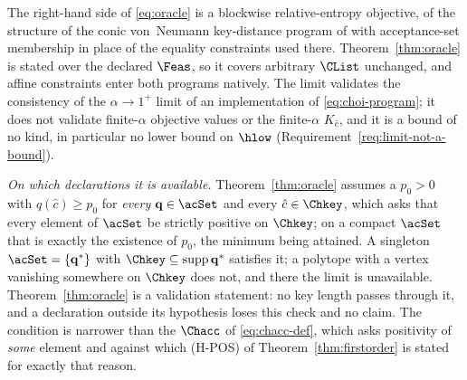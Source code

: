 
\begin{remark}\label{rem:oracle}
The right-hand side of \eqref{eq:oracle} is a blockwise relative-entropy
objective, of the structure of the conic von~Neumann key-distance program
of \cite[Eqs.~(1)--(6)]{winick2018reliable} with acceptance-set membership
in place of the equality constraints used there. Theorem~\ref{thm:oracle}
is stated over the declared $\Feas$, so it covers arbitrary $\CList$
unchanged, and affine constraints enter both programs natively. The limit
validates the consistency of the $\alpha\to1^{+}$ limit of an
implementation of \eqref{eq:choi-program}; it does not validate
finite-$\alpha$ objective values or the finite-$\alpha$ $K_{\hat c}$, and
it is a bound of no kind, in particular no lower bound on $\hlow$
(Requirement~\ref{req:limit-not-a-bound}).

\emph{On which declarations it is available.}
Theorem~\ref{thm:oracle} assumes a $p_0>0$ with $q(\hat c)\ge p_0$ for
\emph{every} $\mathbf q\in\acSet$ and every $\hat c\in\Chkey$, which asks
that every element of $\acSet$ be strictly positive on $\Chkey$; on a
compact $\acSet$ that is exactly the existence of $p_0$, the minimum being
attained. A singleton $\acSet=\{\mathbf q^{*}\}$ with
$\Chkey\subseteq\operatorname{supp}\mathbf q^{*}$ satisfies it; a polytope
with a vertex vanishing somewhere on $\Chkey$ does not, and there the
limit is unavailable. Theorem~\ref{thm:oracle} is a validation statement:
no key length passes through it, and a declaration outside its hypothesis
loses this check and no claim. The condition is narrower than the
 $\Chacc$ of \eqref{eq:chacc-def}, which asks
positivity of \emph{some} element and against which (H-POS) of
Theorem~\ref{thm:firstorder} is stated for exactly that reason.
\end{remark}
